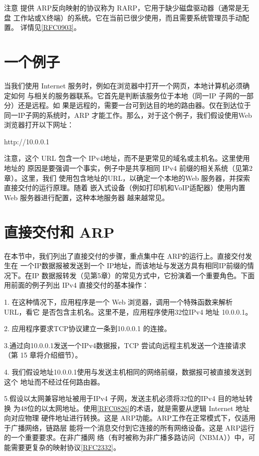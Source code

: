 注意 提供 ARP反向映射的协议称为 RARP，它用于缺少磁盘驱动器（通常是无盘
工作站或X终端）的系统。它在当前已很少使用，而且需要系统管理员手动配置。
详情见\href{https://www.rfc-editor.org/rfc/rfc0903}{[RFC0903]}。

\section{一个例子}

当我们使用 Internet 服务时，例如在浏览器中打开一个网页，本地计算机必须确定如何
与相关的服务器联系。它首先是判断该服务位于本地（同一IP 子网的一部分）还是远程。如
果是远程的，需要一台可到达目的地的路由器。仅在到达位于同一IP子网的系统时，ARP
才能工作。那么，对于这个例子，我们假设使用Web 浏览器打开以下网址：

http://10.0.0.1

注意，这个 URL 包含一个 IPv4地址，而不是更常见的域名或主机名。这里使用地址的
原因是要强调一个事实，例子中是共享相同 IPv4 前缀的相关系统（见第2章）。这里，我们
使用包含地址的URL，以确定一个本地的Web 服务器，并探索直接交付的运行原理。随着
嵌入式设备（例如打印机和VoIP适配器）使用内置Web 服务器进行配置，这种本地服务器
越来越常见。

\section{直接交付和 ARP}

在本节中，我们列出了直接交付的步骤，重点集中在 ARP的运行上。直接交付发生在
一个IP数据报被发送到一个 IP地址，而该地址与发送方具有相同IP前缀的情况下。在IP
数据报转发（见第5章）的常见方式中，它扮演着一个重要角色。下面用前面的例子列出
IPv4 直接交付的基本操作：

1. 在这种情况下，应用程序是一个 Web 浏览器，调用一个特殊函数来解析 URL，看它
是否包含主机名。这里不是，应用程序使用32位IPv4 地址 10.0.0.1。

2. 应用程序要求TCP协议建立一条到10.0.0.1 的连接。

3.通过向10.0.0.1发送一个IPv4数据报，TCP 尝试向远程主机发送一个连接请求（第
15 章将介绍细节）。

4. 我们假设地址10.0.0.1使用与发送主机相同的网络前缀，数据报可被直接发送到这个
地址而不经过任何路由器。

5.假设以太网兼容地址被用于IPv4 子网，发送主机必须将32位的IPv4 目的地址转换
为48位的以太网地址。使用\href{https://www.rfc-editor.org/rfc/rfc0826}{[RFC0826]}的术语，就是需要从逻辑 Internet 地址向对应物理
硬件地址进行转换。这是 ARP功能。ARP工作在正常模式下，仅适用于广播网络，链路层
能将一个消息交付到它连接的所有网络设备。这是 ARP运行的一个重要要求。在非广播网
络（有时被称为非广播多路访问（NBMA））中，可能需要更复杂的映射协议\href{https://www.rfc-editor.org/rfc/rfc2332}{[RFC2332]}。

